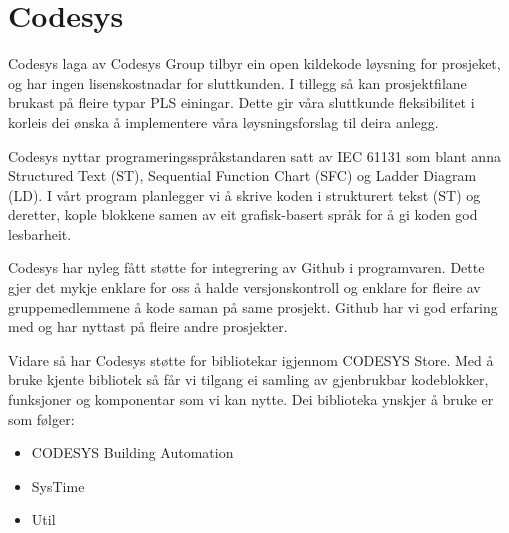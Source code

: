 \section{Codesys}
\thispagestyle{fancy}
Codesys\citep{Codesys} laga av Codesys Group tilbyr ein open kildekode løysning for prosjeket, og har ingen lisenskostnadar for sluttkunden. 
I tillegg så kan prosjektfilane brukast på fleire typar PLS einingar. 
Dette gir våra sluttkunde fleksibilitet i korleis dei ønska å implementere våra løysningsforslag til deira anlegg.

Codesys nyttar programeringsspråkstandaren satt av IEC 61131 som blant anna Structured Text (ST), Sequential Function Chart (SFC) og Ladder Diagram (LD). 
I vårt program planlegger vi å skrive koden i strukturert tekst (ST) og deretter, 
kople blokkene samen av eit grafisk-basert språk for å gi koden god lesbarheit.

Codesys har nyleg fått støtte for integrering av Github i programvaren. 
Dette gjer det mykje enklare for oss å halde versjonskontroll
og enklare for fleire av gruppemedlemmene å kode saman på same prosjekt. 
Github har vi god erfaring med og har nyttast på fleire andre prosjekter. 

Vidare så har Codesys støtte for bibliotekar igjennom CODESYS Store. 
Med å bruke kjente bibliotek så får vi tilgang ei samling av gjenbrukbar kodeblokker, funksjoner og komponentar som vi kan nytte.
Dei biblioteka ynskjer å bruke er som følger:

\begin{itemize}
    \item CODESYS Building Automation \citep{BuildingAutomation}
    \item SysTime \citep{DateAndTime}
    \item Util \citep{DateAndTime}
\end{itemize}


\newpage


